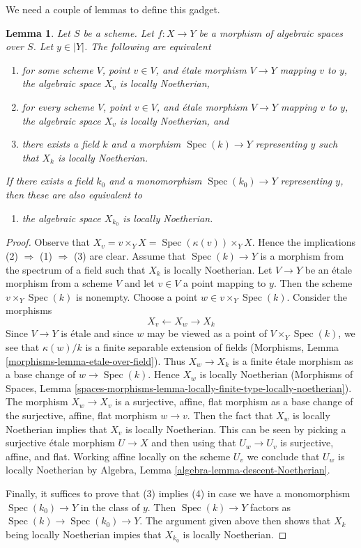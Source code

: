 \documentclass{stacks-project}
\theoremstyle{plain}
\newtheorem{lemma}[subsection]{Lemma}
\theoremstyle{definition}
\theoremstyle{remark}
\numberwithin{equation}{subsection}
\def\Spec{\mathop{\mathrm{Spec}}}
\begin{document}
\noindent
We need a couple of lemmas to define this gadget.

\begin{lemma}
\label{lemma-locally-noetherian-fibre}
Let $S$ be a scheme. Let $f : X \to Y$ be a morphism of algebraic spaces
over $S$. Let $y \in |Y|$. The following are equivalent
\begin{enumerate}
\item for some scheme $V$, point $v \in V$, and \'etale morphism $V \to Y$
mapping $v$ to $y$, the algebraic space $X_v$ is locally Noetherian,
\item for every scheme $V$, point $v \in V$, and \'etale morphism $V \to Y$
mapping $v$ to $y$, the algebraic space $X_v$ is locally Noetherian, and
\item there exists a field $k$ and a morphism $\Spec(k) \to Y$ representing
$y$ such that $X_k$ is locally Noetherian.
\end{enumerate}
If there exists a field $k_0$ and a monomorphism $\Spec(k_0) \to Y$
representing $y$, then these are also equivalent to
\begin{enumerate}
\item[(4)] the algebraic space $X_{k_0}$ is locally Noetherian.
\end{enumerate}
\end{lemma}

\begin{proof}
Observe that $X_v = v \times_Y X = \Spec(\kappa(v)) \times_Y X$.
Hence the implications (2) $\Rightarrow$ (1) $\Rightarrow$ (3) are clear.
Assume that $\Spec(k) \to Y$ is a morphism from the spectrum of a field
such that $X_k$ is locally Noetherian. Let $V \to Y$ be an \'etale morphism
from a scheme $V$ and let $v \in V$ a point mapping to $y$.
Then the scheme $v \times_Y \Spec(k)$ is nonempty. Choose a
point $w \in v \times_Y \Spec(k)$. Consider the morphisms
$$
X_v \longleftarrow X_w \longrightarrow X_k
$$
Since $V \to Y$ is \'etale and since $w$ may be viewed as a point of
$V \times_Y \Spec(k)$, we see that $\kappa(w)/k$
is a finite separable extension of fields
(Morphisms, Lemma \ref{morphisms-lemma-etale-over-field}).
Thus $X_w \to X_k$ is a finite \'etale morphism as a base change of
$w \to \Spec(k)$. Hence $X_w$ is locally Noetherian
(Morphisms of Spaces, Lemma
\ref{spaces-morphisms-lemma-locally-finite-type-locally-noetherian}).
The morphism $X_w \to X_v$ is a surjective, affine, flat morphism
as a base change of the surjective, affine, flat morphism $w \to v$.
Then the fact that $X_w$ is locally Noetherian implies that
$X_v$ is locally Noetherian. This can be seen by picking a
surjective \'etale morphism $U \to X$ and then using that
$U_w \to U_v$ is surjective, affine, and flat. Working
affine locally on the scheme $U_v$ we conclude
that $U_w$ is locally Noetherian by
Algebra, Lemma \ref{algebra-lemma-descent-Noetherian}.

\medskip\noindent
Finally, it suffices to prove that (3) implies (4)
in case we have a monomorphism $\Spec(k_0) \to Y$ in the class of $y$.
Then $\Spec(k) \to Y$ factors as $\Spec(k) \to \Spec(k_0) \to Y$.
The argument given above then shows that $X_k$ being
locally Noetherian impies that $X_{k_0}$ is locally Noetherian.
\end{proof}
\end{document}
